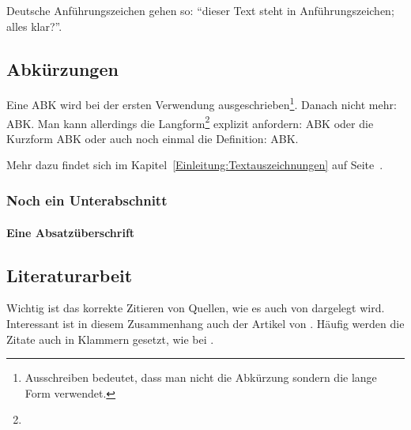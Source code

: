 Deutsche Anführungszeichen gehen so: "`dieser Text steht in \glq Anführungszeichen\grq; alles klar?"'.


\subsection{Abkürzungen}

Eine \ac{ABK} wird bei der ersten Verwendung ausgeschrieben\footnote{Ausschreiben bedeutet, dass man nicht die Abkürzung sondern die lange Form verwendet.}. Danach nicht mehr: \ac{ABK}. Man kann allerdings die Langform\footnote{\blindtext} explizit anfordern: \acl{ABK} oder die Kurzform \acs{ABK} oder auch noch einmal die Definition: \acf{ABK}.

Mehr dazu findet sich im Kapitel~\ref{Einleitung:Textauszeichnungen} auf Seite~\pageref{Einleitung:Textauszeichnungen}.


\subsubsection{Noch ein Unterabschnitt}

\paragraph{Eine Absatzüberschrift}
\blindtext[1]


\subsection{Literaturarbeit}

Wichtig ist das korrekte Zitieren von Quellen, wie es auch von \cite{Kornmeier2011} dargelegt wird. Interessant ist in diesem Zusammenhang auch der Artikel von \cite{Vixie2007}. Häufig werden die Zitate auch in Klammern gesetzt, wie bei \citep{Kornmeier2011}.

\blindtext[4]